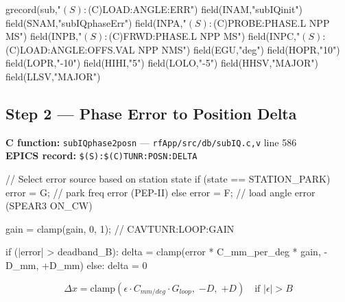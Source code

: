 \begin{codeblock}
grecord(sub,"$(S):$(C)LOAD:ANGLE:ERR") {
    field(INAM,"subIQinit")
    field(SNAM,"subIQphaseErr")
    field(INPA,"$(S):$(C)PROBE:PHASE.L  NPP MS")
    field(INPB,"$(S):$(C)FRWD:PHASE.L   NPP MS")
    field(INPC,"$(S):$(C)LOAD:ANGLE:OFFS.VAL NPP NMS")
    field(EGU,"deg")
    field(HOPR,"10")    field(LOPR,"-10")
    field(HIHI,"5")     field(LOLO,"-5")
    field(HHSV,"MAJOR") field(LLSV,"MAJOR")
}
\end{codeblock}

\subsection{Step 2 --- Phase Error to Position Delta}\label{sec:inner-step2}


\textbf{C function:} \texttt{subIQphase2posn} --- \texttt{rfApp/\allowbreak{}src/\allowbreak{}db/\allowbreak{}subIQ.\allowbreak{}c,\allowbreak{}v} line 586 \\
\textbf{EPICS record:} \texttt{\$(S):\allowbreak{}\$(C)TUNR:\allowbreak{}POSN:\allowbreak{}DELTA}

\begin{codeblock}
// Select error source based on station state
if (state == STATION_PARK) error = G;  // park freq error (PEP-II)
else                        error = F;  // load angle error (SPEAR3 ON_CW)

gain = clamp(gain, 0, 1);  // CAVTUNR:LOOP:GAIN

if (|error| > deadband_B):
    delta = clamp(error * C_mm_per_deg * gain, -D_mm, +D_mm)
else:
    delta = 0
\end{codeblock}

\begin{equation}\label{eq:posn-delta}
  \boxed{\Delta x = \text{clamp}\!\left(\epsilon \cdot C_{mm/deg} \cdot G_{loop},\; {-D},\; {+D}\right) \quad \text{if } |\epsilon| > B}
\end{equation}

